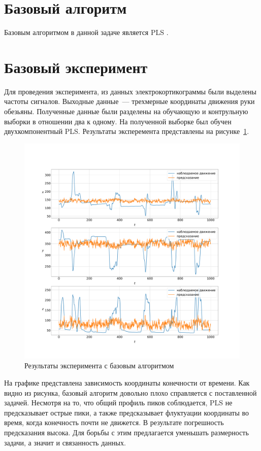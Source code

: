 \section{Базовый алгоритм}
Базовым алгоритмом в данной задаче является PLS \cite{Rosipal2006}.

\section{Базовый эксперимент}
Для проведения эксперимента, из данных электрокортикограммы были выделены частоты сигналов. Выходные данные~--- трехмерные координаты движения руки обезьяны. Полученные данные были разделены на обучающую и контрульную выборки в отношении два к одному. На полученной выборке был обучен двухкомпонентный PLS. Результаты эксперемента представлены на рисунке~\ref{fig:baseAlgo}.
\begin{figure}
  \begin{center}
    \includegraphics[width=\textwidth]{base_algo.pdf}
    \caption{Результаты эксперимента с базовым алгоритмом}
    \label{fig:baseAlgo}
  \end{center}
\end{figure}
На графике представлена зависимость координаты конечности от времени. Как видно из рисунка, базовый алгоритм довольно плохо справляется с поставленной задачей. Несмотря на то, что общий профиль пиков соблюдается, PLS не предсказывает острые пики, а также предсказывает флуктуации координаты во время, когда конечность почти не движется. В результате погрешность предсказания высока. Для борьбы с этим предлагается уменьшать размерность задачи, а значит и связанность данных.
